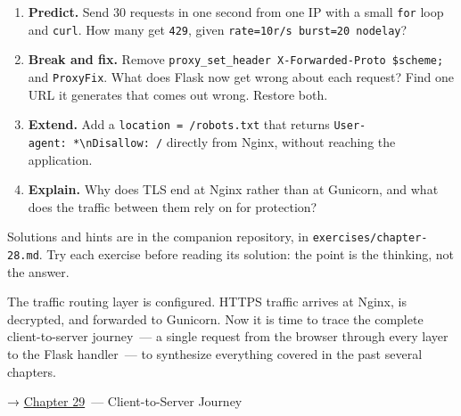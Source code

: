 \label{28-traffic-routing:exercises}

\begin{enumerate}
\def\labelenumi{\arabic{enumi}.}
\tightlist
\item
  \textbf{Predict.} Send 30 requests in one second from one IP with a small \texttt{for} loop and \texttt{curl}. How many get \texttt{429}, given \texttt{rate=}\allowbreak{}\texttt{10r/}\allowbreak{}\texttt{s\ burst=}\allowbreak{}\texttt{20\ nodelay}?
\item
  \textbf{Break and fix.} Remove \texttt{proxy\_}\allowbreak{}\texttt{set\_}\allowbreak{}\texttt{header\ X-}\allowbreak{}\texttt{Forwarded-}\allowbreak{}\texttt{Proto\ \$scheme;} and \texttt{ProxyFix}. What does Flask now get wrong about each request? Find one URL it generates that comes out wrong. Restore both.
\item
  \textbf{Extend.} Add a \texttt{location\ =}\allowbreak{}\texttt{\ /}\allowbreak{}\texttt{robots.txt} that returns \texttt{User-}\allowbreak{}\texttt{agent:}\allowbreak{}\texttt{\ *\textbackslash{}nDisallow:}\allowbreak{}\texttt{\ /} directly from Nginx, without reaching the application.
\item
  \textbf{Explain.} Why does TLS end at Nginx rather than at Gunicorn, and what does the traffic between them rely on for protection?
\end{enumerate}

\noindent{}Solutions and hints are in the companion repository, in \texttt{exercises/}\allowbreak{}\texttt{chapter-28.md}. Try each exercise before reading its solution: the point is the thinking, not the answer.

\label{28-traffic-routing:whats-next}

The traffic routing layer is configured. HTTPS traffic arrives at Nginx, is decrypted, and forwarded to Gunicorn. Now it is time to trace the complete client-to-server journey~--- a single request from the browser through every layer to the Flask handler~--- to synthesize everything covered in the past several chapters.

\noindent{}→ \hyperref[ch:29-client-server-journey]{Chapter 29}~--- Client-to-Server Journey
